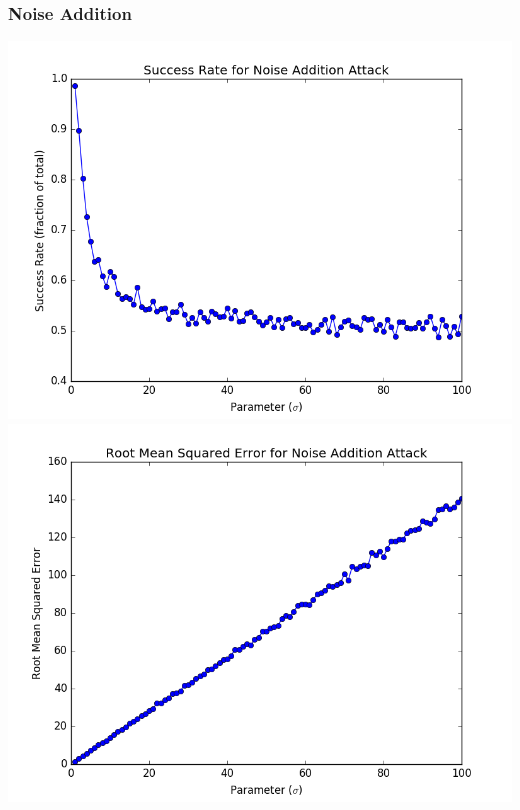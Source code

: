 \documentclass[12pt]{article}
\begin{document}
\subsubsection{Noise Addition}
\includegraphics[scale=0.4]{figures/problem_2_noise_addition_success_rate.png} \includegraphics[scale=0.4]{figures/problem_2_noise_addition_error.png} 
\end{document}
